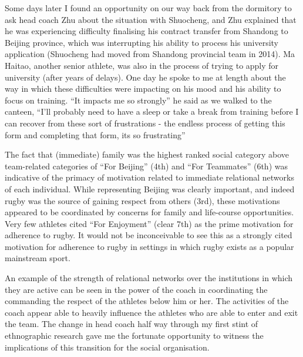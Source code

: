   Some days later I found an opportunity on our way back from the dormitory to ask head coach Zhu about the situation with Shuocheng, and Zhu explained that he was experiencing difficulty finalising his contract transfer from Shandong to Beijing province, which was interrupting his ability to process his university application (Shuocheng had moved from Shandong provincial team in 2014).  Ma Haitao, another senior athlete, was also in the process of trying to apply for university (after years of delays).  One day he spoke to me at length about the way in which these difficulties were impacting on his mood and his ability to focus on training. ``It impacts me so strongly'' he said as we walked to the canteen, ``I’ll probably need to have a sleep or take a break from training before I can recover from these sort of frustrations - the endless process of getting this form and completing that form, its so frustrating''

  The fact that (immediate) family was the highest ranked social category above team-related categories of ``For Beijing'' (4th) and ``For Teammates'' (6th) was indicative of the primacy of motivation related to immediate relational networks of each individual.  While representing Beijing was clearly important, and indeed rugby was the source of gaining respect from others (3rd), these motivations appeared to be coordinated by concerns for family and life-course opportunities.  Very few athletes cited ``For Enjoyment'' (clear 7th) as the prime motivation for adherence to rugby.  It would not be inconceivable to see this as a strongly cited motivation for adherence to rugby in settings in which rugby exists as a popular mainstream sport.

  An example of the strength of relational networks over the institutions in which they are active can be seen in the power of the coach in coordinating the commanding the respect of the athletes below him or her.  The activities of the coach appear able to heavily influence the athletes who are able to enter and exit the team.  The change in head coach half way through my first stint of ethnographic research gave me the fortunate opportunity to witness the implications of this transition for the social organisation.

